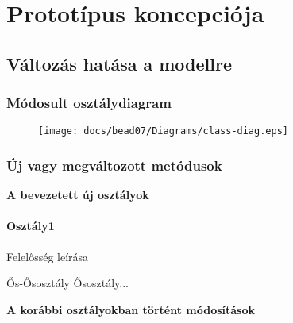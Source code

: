 \documentclass[../../projlab]{subfiles}
\begin{document}
\makeatletter


\makeatother


\chapter{Prototípus koncepciója}
\setcounter{section}{-1}

\section{Változás hatása a modellre}
\subsection{Módosult osztálydiagram}
\begin{figure}[H] 
    \centering 
    \texttt{[image: docs/bead07/Diagrams/class-diag.eps]} 
    \caption{} 
\end{figure} 


\subsection{Új vagy megváltozott metódusok}
\textbf{A bevezetett új osztályok}
\subsubsection{Osztály1}
\begin{class-template-responsibility}
    Felelősség leírása
\end{class-template-responsibility}
\begin{class-template-baseclass}
    Ős-Ősosztály \baseclass Ősosztály... 
\end{class-template-baseclass}
\begin{class-template-method}
\end{class-template-method}
\textbf{A korábbi osztályokban történt módosítások}
\end{document}
